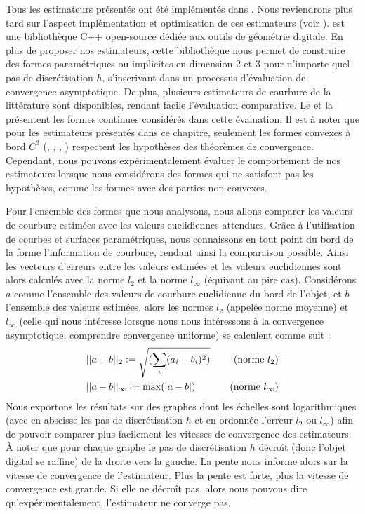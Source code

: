 Tous les estimateurs présentés ont été implémentés dans \DGtal \cite{DGtal}.
Nous reviendrons plus tard sur l'aspect implémentation et optimisation de ces
estimateurs (voir ). \DGtal est une bibliothèque
C++ open-source dédiée aux outils de géométrie digitale. En plus de proposer nos
estimateurs, cette bibliothèque nous permet de construire des formes paramétriques
ou implicites en dimension 2 et 3 pour n'importe quel pas de discrétisation $h$,
s'inscrivant dans un processus d'évaluation de convergence asymptotique. De
plus, plusieurs estimateurs de courbure de la littérature sont disponibles,
rendant facile l'évaluation comparative. Le  et la
 présentent les formes continues considérés
dans cette évaluation. Il est à noter que pour les estimateurs présentés dans ce
chapitre, seulement les formes convexes à bord $C^3$ (\Ellipse, \Sphere,
\RoundedCube, \Ellipsoid) respectent les hypothèses des théorèmes de
convergence. Cependant, nous pouvons expérimentalement évaluer le comportement
de nos estimateurs lorsque nous considérons des formes qui ne satisfont pas les
hypothèses, comme les formes avec des parties non convexes.


Pour l'ensemble des formes que nous analysons, nous allons comparer les valeurs
de courbure estimées avec les valeurs euclidiennes attendues. Grâce à
l'utilisation de courbes et surfaces paramétriques, nous connaissons en tout
point du bord de la forme l'information de courbure, rendant ainsi la
comparaison possible. Ainsi les vecteurs d'erreurs entre les valeurs estimées et les valeurs
euclidiennes sont alors calculés avec la norme $l_2$ et la norme $l_\infty$
(équivaut au pire cas).
%
Considérons $a$ comme l'ensemble des valeurs de courbure euclidienne du bord de
l'objet, et $b$ l'ensemble des valeurs estimées, alors les normes $l_2$ (appelée
norme moyenne) et $l_\infty$ (celle qui nous intéresse lorsque nous nous
intéressons à la convergence asymptotique, comprendre convergence uniforme) se
calculent comme suit :
%
\begin{align}
  &|| a - b ||_2 := \sqrt{(\sum_i(a_i - b_i)^2)} \quad &\text{(norme $l_2$)} \\
  &|| a - b ||_\infty := \max(|a - b|) \quad &\text{(norme $l_\infty$)}
\end{align}
%
Nous exportons les résultats sur des graphes dont les échelles sont
logarithmiques (avec en abscisse les pas de discrétisation $h$ et en ordonnée
l'erreur $l_2$ ou $l_\infty$) afin de pouvoir comparer plus facilement les
vitesses de convergence des estimateurs. À noter que pour chaque graphe le pas
de discrétisation $h$ décroît (donc l'objet digital se raffine) de la droite
vers la gauche. La pente nous informe alors sur la vitesse de convergence de
l'estimateur. Plus la pente est forte, plus la vitesse de convergence
est grande. Si elle ne décroît pas, alors nous pouvons dire
qu'expérimentalement, l'estimateur ne converge pas.
%

